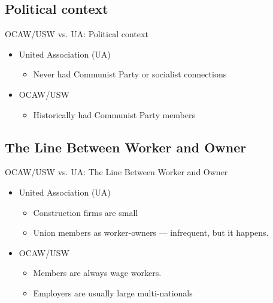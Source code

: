 \documentclass{beamer}
\begin{document}
\subsection{Political context}
\begin{frame}{OCAW/USW vs. UA: Political context}
	\begin{itemize}
		\item United Association (UA)
		\begin{itemize}
			\item Never had Communist Party or socialist connections
		\end{itemize}
		\item OCAW/USW
			\begin{itemize}
				\item Historically had Communist Party members
			\end{itemize}
	\end{itemize}
\end{frame}

\subsection{The Line Between Worker and Owner}
\begin{frame}{OCAW/USW vs. UA: The Line Between Worker and Owner}
	\begin{itemize}
		\item United Association (UA)
		\begin{itemize}
			\item Construction firms are small
			\item Union members as worker-owners — infrequent, but it happens.
		\end{itemize}
		\item OCAW/USW
			\begin{itemize}
				\item Members are always wage workers.
				\item Employers are usually large multi-nationals
			\end{itemize}
	\end{itemize}
\end{frame}
\end{document}
